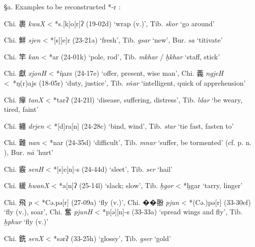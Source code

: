 §a. Examples to be reconstructed *-r :

\begin{description} \item
Chi. 裹 \emph{kwaX} \textless{} *s.{[}k]{}o{[}r]ʔ (19-02d) `wrap
(v.)', Tib. {} \emph{skor} `go around'

\item
Chi. 鮮 \emph{sjen} \textless{} *[s]{[}e]r (23-21a) `fresh', Tib. {} \emph{gsar} `new', Bur. {} \emph{sa} `titivate'

\item
Chi. 竿 \emph{kan} \textless{} *{}ar (24-01k) `pole, rod', Tib. {} \emph{mkhar} / {} \emph{ḫkhar} `staff, stick'

\item
Chi. 獻 \emph{xjonH} \textless{} *ŋ̊ars (24-17e) `offer, present, wise
man', Chi. 義 \emph{ngjeH} \textless{}~*ŋ(r)ajs (18-05r) `duty,
justice', Tib. {} \emph{sṅar} `intelligent, quick of apprehension'

\item
Chi. 癉 \emph{tanX} \textless{} *t{}arʔ (24-21l) `disease, suffering,
distress', Tib. {} \emph{ldar} `be weary, tired, faint'

\item
Chi. 纏 \emph{drjen }\textless{} *[d]ra[n] (24-28c) `bind,
wind', Tib. {} \emph{star} `tie fast, fasten to'

\item
Chi. 難 \emph{nan} \textless{} *n{}ar (24-35d) `difficult', Tib. {} \emph{mnar} `suffer, be tormented' (cf. p. n. ), Bur. {} \emph{nā}
'hurt'

\item
Chi. 霰 \emph{senH} \textless{} *[s]{}e[n]-s (24-44d) `sleet',
Tib. {} \emph{ser} `hail'

\item
Chi. 緩 \emph{hwanX }\textless{} *{}a[n]ʔ (25-14l) `slack;
slow', Tib. {} \emph{ḫgor} \textless{} *ḫg{}ar `tarry, linger'

\item
Chi. 飛 \emph{p{}} \textless{} *Cə.pə{[}r] (27-09a) `fly (v.)', Chi.
��翂 \emph{pjun} \textless{} *(Cə.)pə{[}r] (33-30ef) `fly (v.), soar',
Chi. 奮 \emph{pjunH} \textless{} *p{[}ə][n]-s (33-33a) `spread
wings and fly', Tib. {} \emph{ḫphur} `fly (v.)'

\item
Chi. 銑 \emph{senX} \textless{} *sərʔ (33-25h) `glossy', Tib. {} \emph{gser} `gold'
\end{description}

